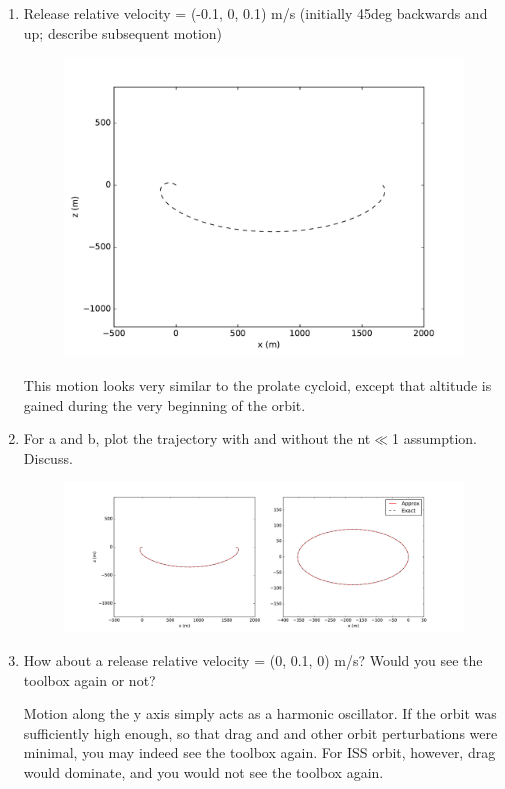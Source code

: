 \documentclass[onecolumn,10pt]{jhwhw}
\begin{document}
\begin{enumerate}
\begin{figure}[h!]
\begin{center}
\end{center}
\end{figure}
\item Release relative velocity = (-0.1, 0, 0.1) m/s (initially 45deg backwards and up; describe subsequent motion)
\begin{figure}[h!]
\begin{center}
\includegraphics[height=0.37\textheight]{6c.pdf}
\vspace{-1.5em}
\end{center}
\end{figure}

This motion looks very similar to the prolate cycloid, except that altitude is gained during the very beginning of the orbit.
\item For a and b, plot the trajectory with and without the nt$\ll$1 assumption. Discuss.
\begin{figure}[h!]
\begin{center}
\includegraphics[width=1\textwidth]{6dboth.pdf}
\vspace{-1.5em}
\end{center}
\end{figure}
\item How about a release relative velocity = (0, 0.1, 0) m/s? Would you see the toolbox again or not?

Motion along the y axis simply acts as a harmonic oscillator. If the orbit was sufficiently high enough, so that drag and and other orbit perturbations were minimal, you may indeed see the toolbox again. For ISS orbit, however, drag would dominate, and you would not see the toolbox again.
\end{enumerate}
\clearpage
\end{document}
